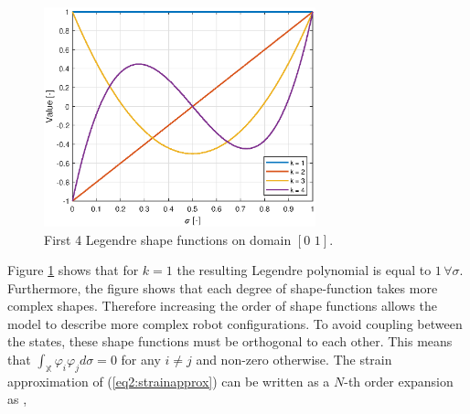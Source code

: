 \begin{figure}[H]
    \centering
    \includegraphics[width = 0.7\textwidth ]{Figures/Chapter2/shapefunction.eps}
    \caption{First 4 Legendre shape functions on domain $[0 \hspace{4pt} 1]$.}
    \label{fig2:shapefunction}
\end{figure}

Figure \ref{fig2:shapefunction} shows that for $k=1$ the resulting Legendre polynomial is equal to $1 \hspace{2pt} \forall \sigma$. Furthermore, the figure shows that each degree of shape-function takes more complex shapes. Therefore increasing the order of shape functions allows the model to describe more complex robot configurations. To avoid coupling between the states, these shape functions must be orthogonal to each other. This means that $\int_\mathbb{X} \varphi_i \varphi_j d \sigma = 0$ for any $i \neq j$ and non-zero otherwise. The strain approximation of (\ref{eq2:strainapprox}) can be written as a $N$-th order expansion as \cite{Caasenbrood2020},



